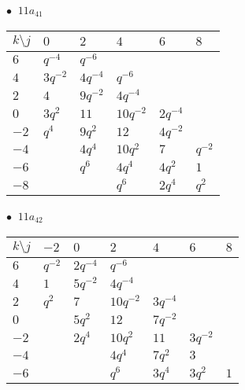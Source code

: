 \begin{minipage}{\linewidth}
$\bullet\ $ $11a_{41}$ \vspace{0.5em} \\
\begin{tabular}{l|lllll}
$k \setminus j$ & $0$ & $2$ & $4$ & $6$ & $8$ \\
\hline
$6$ & $q^{-4}$ & $q^{-6}$ &  &  &  \\
$4$ & $3q^{-2}$ & $4q^{-4}$ & $q^{-6}$ &  &  \\
$2$ & $4$ & $9q^{-2}$ & $4q^{-4}$ &  &  \\
$0$ & $3q^{2}$ & $11$ & $10q^{-2}$ & $2q^{-4}$ &  \\
$-2$ & $q^{4}$ & $9q^{2}$ & $12$ & $4q^{-2}$ &  \\
$-4$ &  & $4q^{4}$ & $10q^{2}$ & $7$ & $q^{-2}$ \\
$-6$ &  & $q^{6}$ & $4q^{4}$ & $4q^{2}$ & $1$ \\
$-8$ &  &  & $q^{6}$ & $2q^{4}$ & $q^{2}$ \\
\end{tabular}
\vspace{2em}
\end{minipage}
%
\begin{minipage}{\linewidth}
$\bullet\ $ $11a_{42}$ \vspace{0.5em} \\
\begin{tabular}{l|llllll}
$k \setminus j$ & $-2$ & $0$ & $2$ & $4$ & $6$ & $8$ \\
\hline
$6$ & $q^{-2}$ & $2q^{-4}$ & $q^{-6}$ &  &  &  \\
$4$ & $1$ & $5q^{-2}$ & $4q^{-4}$ &  &  &  \\
$2$ & $q^{2}$ & $7$ & $10q^{-2}$ & $3q^{-4}$ &  &  \\
$0$ &  & $5q^{2}$ & $12$ & $7q^{-2}$ &  &  \\
$-2$ &  & $2q^{4}$ & $10q^{2}$ & $11$ & $3q^{-2}$ &  \\
$-4$ &  &  & $4q^{4}$ & $7q^{2}$ & $3$ &  \\
$-6$ &  &  & $q^{6}$ & $3q^{4}$ & $3q^{2}$ & $1$ \\
\end{tabular}
\vspace{2em}
\end{minipage}
%
